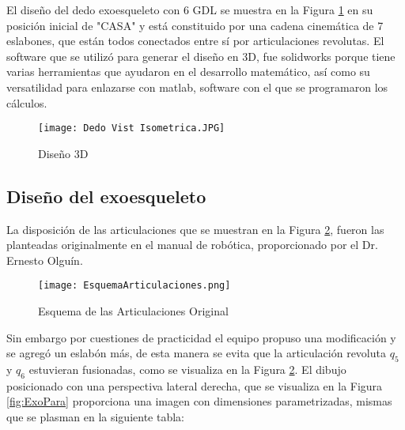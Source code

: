 \noindent El diseño del dedo exoesqueleto con 6 GDL se muestra en la Figura \ref{fig:3DModel} en su posición inicial de
"CASA" y está constituido por una cadena cinemática de 7 eslabones, que están todos conectados entre sí por articulaciones
revolutas. El software que se utilizó para generar el diseño en 3D, fue solidworks porque tiene varias herramientas que
ayudaron en el desarrollo matemático, así como su versatilidad para enlazarse con matlab, software con el que se
programaron los cálculos.  
\begin{figure}[H]
    \centering
    \texttt{[image: Dedo Vist Isometrica.JPG]} 
    \caption{Diseño 3D}
    \label{fig:3DModel}
\end{figure}

\subsection{Diseño del exoesqueleto}
\noindent La disposición de las articulaciones que se muestran en la Figura \ref{fig:EsqArtOri}, fueron las planteadas
originalmente en el manual de robótica, proporcionado por el Dr. Ernesto Olguín.

\begin{figure}[H]
    \centering
    \texttt{[image: EsquemaArticulaciones.png]} 
    \caption{Esquema de las Articulaciones Original}
    \label{fig:EsqArtOri}
\end{figure}
\noindent Sin embargo por cuestiones de practicidad el equipo propuso una modificación y se agregó un eslabón más, de
esta manera se evita que la articulación revoluta  $q_5$ y  $q_6$ estuvieran fusionadas, como se visualiza en la 
Figura \ref{fig:EsqArtOri}. El dibujo posicionado con una perspectiva lateral derecha, que se visualiza en la Figura 
\ref{fig:ExoPara} proporciona una imagen con dimensiones parametrizadas, mismas que se plasman en la siguiente tabla: 

